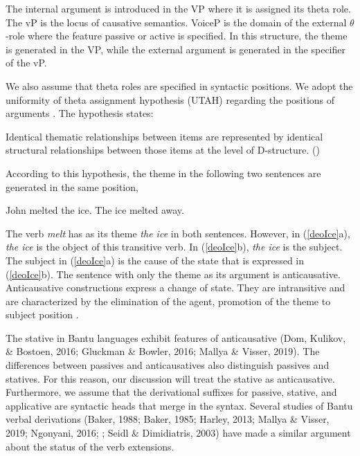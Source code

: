 \documentclass[output=paper]{langscibook}
\begin{document}
The internal argument is introduced in the VP where it is assigned its theta role. The vP is the locus of causative semantics. VoiceP is the domain of the external $\theta$-role where the feature passive or active is specified. In this structure, the theme is generated in the VP, while the external argument is generated in the specifier of the vP.

We also assume that theta roles are specified in syntactic positions. We adopt the uniformity of theta assignment hypothesis (UTAH) regarding the positions of arguments \citep{Baker:1988aa}. The hypothesis states:

\begin{exe}
\ex\label{deo2}{ 
 Identical thematic relationships between items are represented by identical structural relationships between those items at the level of D-structure. (\citet[46]{Baker:1988aa})
}
\end{exe}

According to this hypothesis, the theme in the following two sentences are generated in the same position,

\begin{exe}
\ex\label{deoIce}{ 
\begin{xlist}
\ex John melted the ice.
\ex The ice melted away.
\end{xlist}
}
\end{exe}

The verb \textit{melt} has as its theme \textit{the ice} in both sentences. However, in (\ref{deoIce}a), \textit{the ice} is the object of this transitive verb. In (\ref{deoIce}b), \textit{the ice} is the subject. The subject in (\ref{deoIce}a) is the cause of the state that is expressed in (\ref{deoIce}b). The sentence with only the theme as its argument is anticausative. Anticausative constructions express a change of state. They are intransitive and are characterized by the elimination of the agent, promotion of the theme to subject position \citep{domEtal2016,Haspelmathl2016,Heidinger2015,Kulikov2011}.

The stative in Bantu languages exhibit features of anticausative (Dom, Kulikov, \& Bostoen, 2016; Gluckman \& Bowler, 2016; Mallya \& Visser, 2019). The differences between passives and anticausatives also distinguish passives and statives. For this reason, our discussion will treat the stative as anticausative. Furthermore, we assume that the derivational suffixes for passive, stative, and applicative are syntactic heads that merge in the syntax. Several studies of Bantu verbal derivations (Baker, 1988; Baker, 1985; Harley, 2013; Mallya \& Visser, 2019; Ngonyani, 2016; \citet{pylkkanen08}; Seidl \& Dimidiatris, 2003) have made a similar argument about the status of the verb extensions. 
\end{document}

